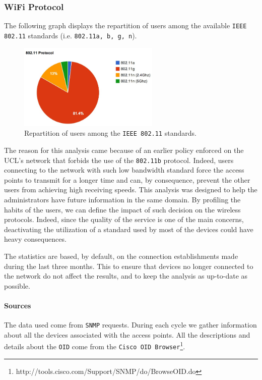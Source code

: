 \subsubsection*{WiFi Protocol}

The following graph displays the repartition of users among the available \texttt{IEEE 802.11} standards (i.e. \texttt{802.11a, b, g, n}). 

\begin{figure}[H]
	\centering
   \includegraphics[width=0.6\textwidth]{Pictures/chapter5/ip-proto.jpg}
   \caption{Repartition of users among the \texttt{IEEE 802.11} standards.}
\end{figure} 

The reason for this analysis came because of an earlier policy enforced on the UCL's network that forbids the use of the \texttt{802.11b} protocol. Indeed, users connecting to the network with such low bandwidth standard force the access points to transmit for a longer time and can, by consequence, prevent the other users from achieving high receiving speeds. This analysis was designed to help the administrators have future information in the same domain. By profiling the habits of the users, we can define the impact of such decision on the wireless protocols. Indeed, since the quality of the service is one of the main concerns, deactivating the utilization of a standard used by most of the devices could have heavy consequences.

The statistics are based, by default, on the connection establishments made during the last three months. This to ensure that devices no longer connected to the network do not affect the results, and to keep the analysis as up-to-date as possible.

\paragraph*{Sources} The data used come from \texttt{SNMP} requests. During each cycle we gather information about all the devices associated with the access points. All the descriptions and details about the \texttt{OID} come from the \texttt{Cisco OID Browser}\footnote{http://tools.cisco.com/Support/SNMP/do/BrowseOID.do}.

